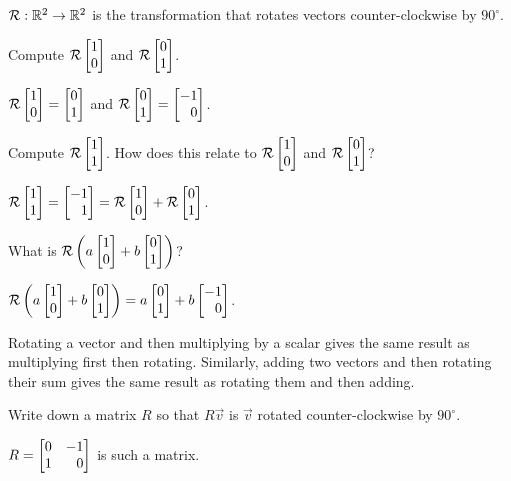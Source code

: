 \documentclass{workbook}
\begin{document}
\begin{slide}
\begin{annotation}
\begin{notes}
\begin{itemize}
			\end{itemize}
		\end{notes}
	\end{annotation}
	$\mathcal R:\mathbb{R}^2\to\mathbb{R}^2$ is the transformation that rotates vectors counter-clockwise
	by $90^\circ$.
	\begin{parts}
		\item Compute $\mathcal R\mat{1\\0}$ and $\mathcal R\mat{0\\1}$.
			\begin{solution}[inline]
				$\mathcal R\mat{1\\0}=\mat{0\\1}$ and
				$\mathcal R\mat{0\\1}=\mat{-1\\0}$.
			\end{solution}
		\item Compute $\mathcal R\mat{1\\1}$. How does this relate to
			$\mathcal R\mat{1\\0}$ and $\mathcal R\mat{0\\1}$?
			\begin{solution}
				$\mathcal R\mat{1\\1}=\mat{-1\\1}=\mathcal R\mat{1\\0}+\mathcal R\mat{0\\1}$.
			\end{solution}
		\item What is $\mathcal R\left(a\mat{1\\0}+b\mat{0\\1}\right)$?
			\begin{solution}
				$\mathcal R\left(a\mat{1\\0}+b\mat{0\\1}\right)=a\mat{0\\1}+b\mat{-1\\0}$.

				Rotating a vector and then multiplying by a scalar gives the same
				result as multiplying first then rotating. Similarly, adding two
				vectors and then rotating their sum gives the same result as rotating
				them and then adding.
			\end{solution}
		\item Write down a matrix $R$ so that $R\vec v$ is $\vec v$ rotated
			counter-clockwise by $90^\circ$.
			\begin{solution}
				$R = \mat{0&-1\\1&0}$ is such a matrix.
			\end{solution}
	\end{parts}

\end{slide}
\end{document}
